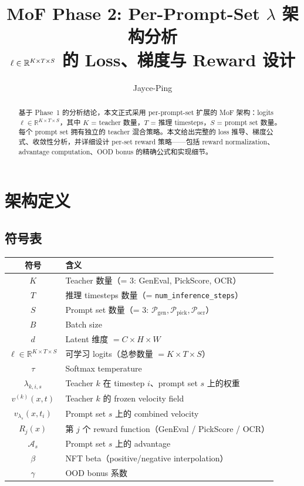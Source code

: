 \documentclass[11pt,a4paper]{article}
\title{\textbf{MoF Phase 2: Per-Prompt-Set $\lambda$ 架构分析}\\[0.3em]
\large $\ell \in \R^{K \times T \times S}$ 的 Loss、梯度与 Reward 设计}
\author{Jayce-Ping}
\date{}
\newcommand{\R}{\mathbb{R}}
\newcommand{\adv}{\mathcal{A}}
\theoremstyle{definition}
\begin{document}
\maketitle

\begin{abstract}
基于 Phase~1 的分析结论，本文正式采用 per-prompt-set 扩展的 MoF 架构：logits $\ell \in \R^{K \times T \times S}$，其中 $K$ = teacher 数量，$T$ = 推理 timesteps，$S$ = prompt set 数量。每个 prompt set 拥有独立的 teacher 混合策略。本文给出完整的 loss 推导、梯度公式、收敛性分析，并详细设计 per-set reward 策略——包括 reward normalization、advantage computation、OOD bonus 的精确公式和实现细节。
\end{abstract}

\tableofcontents
\newpage

\section{架构定义}
\label{sec:architecture}

\subsection{符号表}

\begin{center}
\renewcommand{\arraystretch}{1.3}
\begin{tabular}{cl}
\toprule
\textbf{符号} & \textbf{含义} \\
\midrule
$K$ & Teacher 数量（= 3: GenEval, PickScore, OCR） \\
$T$ & 推理 timesteps 数量（= \texttt{num\_inference\_steps}） \\
$S$ & Prompt set 数量（= 3: $\mathcal{P}_{\mathrm{gen}}, \mathcal{P}_{\mathrm{pick}}, \mathcal{P}_{\mathrm{ocr}}$） \\
$B$ & Batch size \\
$d$ & Latent 维度 $= C \times H \times W$ \\
$\ell \in \R^{K \times T \times S}$ & 可学习 logits（总参数量 $= K \times T \times S$） \\
$\tau$ & Softmax temperature \\
$\lambda_{k,i,s}$ & Teacher $k$ 在 timestep $i$、prompt set $s$ 上的权重 \\
$v^{(k)}(x, t)$ & Teacher $k$ 的 frozen velocity field \\
$v_{\lambda_s}(x, t_i)$ & Prompt set $s$ 上的 combined velocity \\
$R_j(x)$ & 第 $j$ 个 reward function（GenEval / PickScore / OCR） \\
$\adv_s$ & Prompt set $s$ 上的 advantage \\
$\beta$ & NFT beta（positive/negative interpolation） \\
$\gamma$ & OOD bonus 系数 \\
\bottomrule
\end{tabular}
\end{center}
\end{document}
